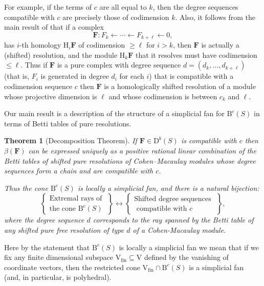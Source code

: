 \documentclass[12pt]{amsart}
\newtheorem{thm}[lemma]{Theorem}
\theoremstyle{definition}
\theoremstyle{remark}
\newcommand{\HH}{\mathrm{H}}
\newcommand{\VV}{\mathrm{V}}
\newcommand{\cc}{c}
\newcommand{\dd}{d}
\newcommand{\FF}{\mathbf{F}}
\newcommand{\DD}{\mathrm{D}}
\newcommand{\BBQ}{\mathrm{B}}
\begin{document}
For example, if the terms of $\cc$ are all equal to $k$, then the degree sequences
compatible with $\cc$ are precisely those of codimension $k$.
Also, it follows from the main result of \cite{WMACE} that if a complex
$$
\FF: F_{k}\leftarrow \cdots \leftarrow F_{k+\ell}\leftarrow 0,
$$
has $i$-th homology $\HH_{i}\FF$ of codimension $\geq\ell$ for $i>k$, then $\FF$ is actually a (shifted) resolution, and the module $\HH_{k}\FF$ that it resolves must have codimension $\leq \ell$. Thus if $\FF$ is a pure complex with degree sequence $\dd = (d_{k}, \dots,d_{k+\ell})$ (that is,   $F_{i}$ is generated in degree $d_{i}$ for each $i$) that is compatible with a codimension sequence $\cc$
then
$\FF$ is a homologically shifted resolution of a module whose projective dimension is $\ell$ and whose codimension is between
$c_{k}$ and $\ell$. 

Our main result is a description of the structure of a simplicial fan for $\BBQ^{\cc}(S)$ in terms of  Betti tables of pure resolutions.  

\begin{thm}[Decomposition Theorem]\label{thm:extremal rays refined}
If $\FF\in \DD^b(S)$  is compatible with $\cc$ then  $\beta(\FF)$ can be expressed
uniquely as a positive rational linear combination of the Betti tables of shifted pure resolutions of Cohen--Macaulay modules whose degree sequences form a chain and are compatible with $\cc$.

Thus the cone $\BBQ^{\cc}(S)$ is locally a simplicial fan, and there is a natural bijection:
\[
\left\{
\begin{matrix}
\text{Extremal rays of }\\
\text{the cone } \BBQ^{\cc}(S)
\end{matrix}
\right\}
\longleftrightarrow
\left\{
\begin{matrix}
\text{Shifted degree sequences }\\
\text{ compatible with $\cc$}
\end{matrix}
\right\},
\]
where the  degree sequence $\dd$ corresponds to the ray spanned by 
the Betti table of any shifted pure free resolution of type $\dd$ of a Cohen-Macaulay module. 
\end{thm}

Here by the statement that $\BBQ^{\cc}(S)$ is locally a simplicial fan we mean that if we fix any finite dimensional subspace $\VV_{\text{fin}}\subseteq \VV$ defined by the vanishing of coordinate vectors, then the restricted cone $\VV_{\text{fin}}\cap \BBQ^{\cc}(S)$ is a simplicial fan (and, in particular,
is polyhedral). 
\end{document}
